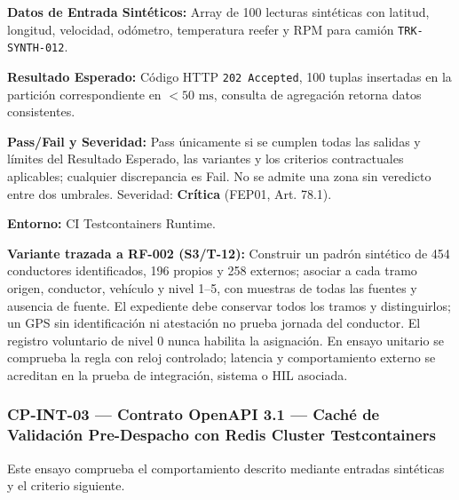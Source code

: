 \par\noindent\textbf{Datos de Entrada Sintéticos:} Array de 100 lecturas sintéticas con latitud, longitud, velocidad, odómetro, temperatura reefer y RPM para camión \texttt{T\allowbreak{}R\allowbreak{}K\allowbreak{}-\allowbreak{}S\allowbreak{}Y\allowbreak{}N\allowbreak{}T\allowbreak{}H\allowbreak{}-\allowbreak{}0\allowbreak{}1\allowbreak{}2\allowbreak{}}.\par
\par\noindent\textbf{Resultado Esperado:} Código HTTP \texttt{2\allowbreak{}0\allowbreak{}2\allowbreak{} A\allowbreak{}c\allowbreak{}c\allowbreak{}e\allowbreak{}p\allowbreak{}t\allowbreak{}e\allowbreak{}d\allowbreak{}}, 100 tuplas insertadas en la partición correspondiente en \(< 50\text{ ms}\), consulta de agregación retorna datos consistentes.\par
\par\noindent\textbf{Pass/Fail y Severidad:} Pass únicamente si se cumplen todas las salidas y límites del Resultado Esperado, las variantes y los criterios contractuales aplicables; cualquier discrepancia es Fail. No se admite una zona sin veredicto entre dos umbrales. Severidad: \textbf{Crítica} (FEP01, Art. 78.1).\par
\par\noindent\textbf{Entorno:} CI Testcontainers Runtime.\par







\par\noindent\textbf{Variante trazada a RF-002 (S3/T-12):} Construir un padrón sintético de 454 conductores identificados, 196 propios y 258 externos; asociar a cada tramo origen, conductor, vehículo y nivel 1–5, con muestras de todas las fuentes y ausencia de fuente. El expediente debe conservar todos los tramos y distinguirlos; un GPS sin identificación ni atestación no prueba jornada del conductor. El registro voluntario de nivel 0 nunca habilita la asignación. En ensayo unitario se comprueba la regla con reloj controlado; latencia y comportamiento externo se acreditan en la prueba de integración, sistema o HIL asociada.\par
\subsubsection*{CP-INT-03 — Contrato OpenAPI 3.1 — Caché de Validación Pre-Despacho con Redis Cluster Testcontainers}\label{sec:9-cp-int-03}
Este ensayo comprueba el comportamiento descrito mediante entradas sintéticas y el criterio siguiente.

